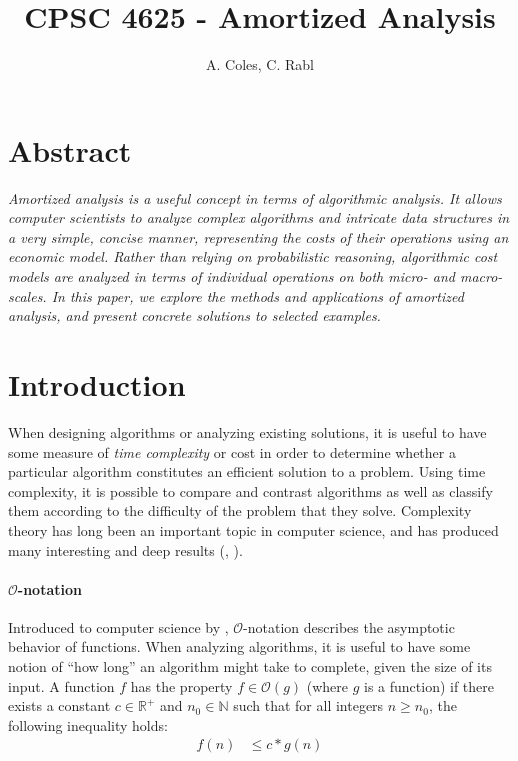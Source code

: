 \documentclass[12pt]{article}
\title{CPSC 4625 - Amortized Analysis}
\author{A. Coles, C. Rabl}
\date{}
\begin{document}
\maketitle

\section*{Abstract}
\emph{Amortized analysis is a useful concept in terms of algorithmic analysis. It allows computer scientists to analyze complex algorithms and intricate data structures in a very simple, concise manner, representing the costs of their operations using an economic model. Rather than relying on probabilistic reasoning, algorithmic cost models are analyzed in terms of individual operations on both micro- and macro-scales. In this paper, we explore the methods and applications of amortized analysis, and present concrete solutions to selected examples.}

\section*{Introduction}

When designing algorithms or analyzing existing solutions, it is useful to have some measure of \emph{time complexity} or cost in order to determine whether a particular algorithm constitutes an efficient solution to a problem. Using time complexity, it is possible to compare and contrast algorithms as well as classify them according to the difficulty of the problem that they solve. Complexity theory has long been an important topic in computer science, and has produced many interesting and deep results (\cite{Karp72}, \cite{Savitch70}).

\paragraph{$\mathcal{O}$-notation} Introduced to computer science by \cite{Knuth76}, $\mathcal{O}$-notation describes the asymptotic behavior of functions. When analyzing algorithms, it is useful to have some notion of ``how long'' an algorithm might take to complete, given the size of its input. A function $f$ has the property $f \in \mathcal{O}(g)$ (where $g$ is a function) if there exists a constant $c \in \mathbb{R}^{+}$ and $n_{0} \in \mathbb{N}$ such that for all integers $n \geq n_{0}$, the following inequality holds:
\begin{align}
f(n) &\leq c*g(n)
\end{align}
\end{document}
